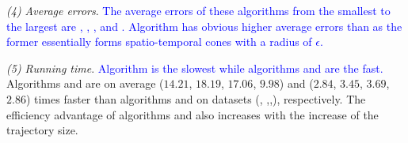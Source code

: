 
\sstab\emph{(4) Average errors}. \textcolor{blue}{The average errors of these algorithms from the smallest to the largest are \squishe, \dps, \cist, \cisto and \cista. Algorithm \cista has obvious higher average errors than \cist as the former essentially forms spatio-temporal cones with a radius of $\epsilon$.}


\sstab\emph{(5) Running time}. \textcolor{blue}{Algorithm \cisto is the slowest while algorithms \cist and \cista are the fast.} Algorithms \cist and \cista are on average
($14.21$, $18.19$, $17.06$, $9.98$) and ($2.84$, $3.45$, $3.69$, $2.86$) times faster than algorithms \dps and \squishe on {datasets} (\sercar, {\geolife},\mopsi,\pricar), respectively.
The efficiency advantage of algorithms \cist and \cista also increases  with the increase of the trajectory size.






